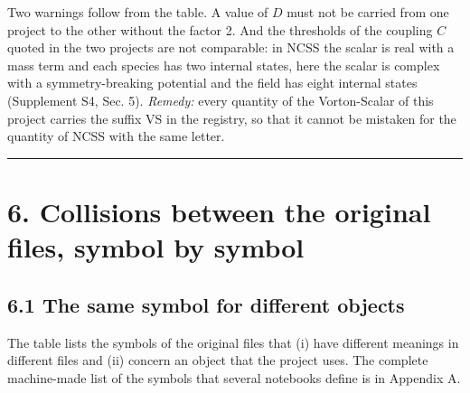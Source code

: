 \documentclass[
  10pt,
]{article}
\begin{document}
Two warnings follow from the table. A value of \(D\) must not be carried
from one project to the other without the factor 2. And the thresholds
of the coupling \(C\) quoted in the two projects are not comparable: in
NCSS the scalar is real with a mass term and each species has two
internal states, here the scalar is complex with a symmetry-breaking
potential and the field has eight internal states (Supplement S4, Sec.
5). \emph{Remedy:} every quantity of the Vorton-Scalar of this project
carries the suffix VS in the registry, so that it cannot be mistaken for
the quantity of NCSS with the same letter.

\begin{center}\rule{0.5\linewidth}{0.5pt}\end{center}

\hypertarget{collisions-between-the-original-files-symbol-by-symbol}{%
\section{6. Collisions between the original files, symbol by
symbol}\label{collisions-between-the-original-files-symbol-by-symbol}}

\hypertarget{the-same-symbol-for-different-objects}{%
\subsection{6.1 The same symbol for different
objects}\label{the-same-symbol-for-different-objects}}

The table lists the symbols of the original files that (i) have
different meanings in different files and (ii) concern an object that
the project uses. The complete machine-made list of the symbols that
several notebooks define is in Appendix A.
\end{document}

